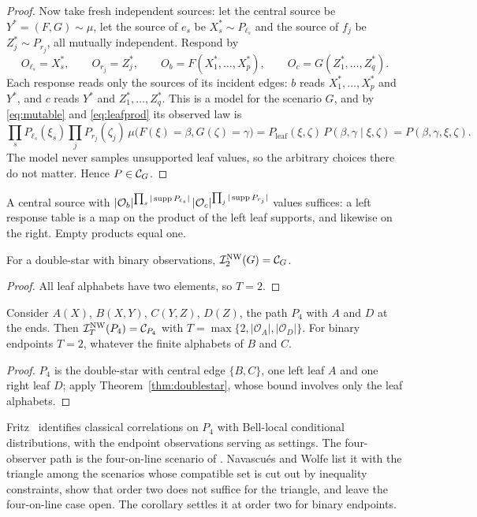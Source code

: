 \begin{proof}
Now take fresh independent sources: let the central source be $Y^*=(F,G)\sim\mu$, let the source of $e_s$ be $X_s^*\sim P_{\ell_s}$ and the source of $f_j$ be $Z_j^*\sim P_{r_j}$, all mutually independent. Respond by
\[
O_{\ell_s}=X_s^*,\qquad O_{r_j}=Z_j^*,\qquad O_b=F(X_1^*,\dots,X_p^*),\qquad O_c=G(Z_1^*,\dots,Z_q^*).
\]
Each response reads only the sources of its incident edges: $b$ reads $X_1^*,\dots,X_p^*$ and $Y^*$, and $c$ reads $Y^*$ and $Z_1^*,\dots,Z_q^*$. This is a model for the scenario $G$, and by \eqref{eq:mutable} and \eqref{eq:leafprod} its observed law is
\[
\prod_sP_{\ell_s}(\xi_s)\prod_jP_{r_j}(\zeta_j)\,\mu\bigl(F(\xi)=\beta,G(\zeta)=\gamma\bigr)
=P_{\mathrm{leaf}}(\xi,\zeta)\,P(\beta,\gamma\mid\xi,\zeta)=P(\beta,\gamma,\xi,\zeta).
\]
The model never samples unsupported leaf values, so the arbitrary choices there do not matter. Hence $P\in\mathcal C_{G}$.
\end{proof}

A central source with
\(
|\mathcal O_b|^{\prod_s|\operatorname{supp} P_{\ell_s}|}\,|\mathcal O_c|^{\prod_j|\operatorname{supp} P_{r_j}|}
\)
values suffices: a left response table is a map on the product of the left leaf supports, and likewise on the right. Empty products equal one.

\begin{corollary}\label{cor:doublestarbinary}
For a double-star with binary observations, $\mathcal I^{\mathrm{NW}}_2(G)=\mathcal C_{G}$.
\end{corollary}

\begin{proof}
All leaf alphabets have two elements, so $T=2$.
\end{proof}

\begin{corollary}\label{cor:path}
Consider $A(X)$, $B(X,Y)$, $C(Y,Z)$, $D(Z)$, the path $P_4$ with $A$ and $D$ at the ends. Then $\mathcal I^{\mathrm{NW}}_T(P_4)=\mathcal C_{P_4}$ with $T=\max\{2,|\mathcal O_A|,|\mathcal O_D|\}$. For binary endpoints $T=2$, whatever the finite alphabets of $B$ and $C$.
\end{corollary}

\begin{proof}
$P_4$ is the double-star with central edge $\{B,C\}$, one left leaf $A$ and one right leaf $D$; apply Theorem~\ref{thm:doublestar}, whose bound involves only the leaf alphabets.
\end{proof}
Fritz~\cite[Theorem~2.4]{Fritz2012} identifies classical correlations on $P_4$ with Bell-local conditional distributions, with the endpoint observations serving as settings. The four-observer path is the four-on-line scenario of \cite[Figure~8]{NW2020}. Navascu\'es and Wolfe list it with the triangle among the scenarios whose compatible set is cut out by inequality constraints, show that order two does not suffice for the triangle, and leave the four-on-line case open. The corollary settles it at order two for binary endpoints.

